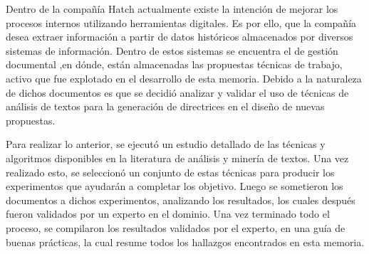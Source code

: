 Dentro de la compañía Hatch actualmente existe la intención de mejorar los procesos internos utilizando herramientas digitales. Es por ello, que la compañía desea extraer información a partir de datos históricos almacenados por diversos sistemas de información. Dentro de estos sistemas se encuentra el de gestión documental ,en dónde, están almacenadas las propuestas técnicas de trabajo, activo que fue explotado en el desarrollo de esta memoria. Debido a la naturaleza de dichos documentos es que se decidió analizar y validar el uso de técnicas de análisis de textos para la generación de directrices en el diseño de nuevas propuestas.

Para realizar lo anterior, se ejecutó un estudio detallado de las técnicas y algoritmos disponibles en la literatura de análisis y minería de textos. Una vez realizado esto, se seleccionó un conjunto de estas técnicas para producir los experimentos que ayudarán a completar los objetivo. Luego se sometieron los documentos a dichos experimentos, analizando los resultados, los cuales después fueron validados por un experto en el dominio. Una vez terminado todo el proceso, se compilaron los resultados validados por el experto, en una guía de buenas prácticas, la cual resume todos los hallazgos encontrados en esta memoria. 

